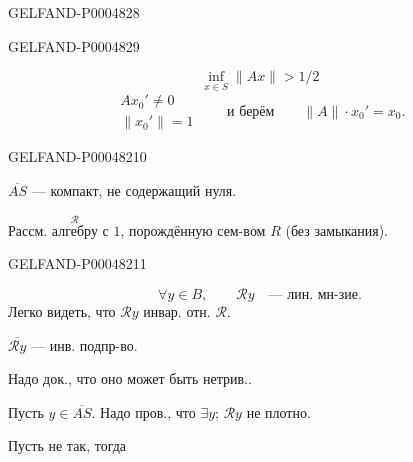 \begin{GelfandAdjacentEvidence}{GELFAND-P000482}{8}

\end{GelfandAdjacentEvidence}
\begin{GelfandAdjacentEvidence}{GELFAND-P000482}{9}

\[
\inf_{x\in S}\lVert Ax\rVert>1/2
\]
\[
\begin{gathered}
Ax_0'\ne0\\
\lVert x_0'\rVert=1
\end{gathered}
\qquad\text{и берём}\qquad
\lVert A\rVert\cdot x_0'=x_0.
\]
\end{GelfandAdjacentEvidence}
\begin{GelfandAdjacentEvidence}{GELFAND-P000482}{10}


$\overline{AS}$ — компакт, не содержащий нуля.

Рассм. $\overset{\mathcal R}{\text{алгебру}}$ с $1$,
порождённую сем-вом $R$ (без замыкания).
\end{GelfandAdjacentEvidence}
\begin{GelfandAdjacentEvidence}{GELFAND-P000482}{11}

\[
\forall y\in B,\qquad \mathcal R y\quad\text{— лин. мн-зие}.
\]
Легко видеть, что $\mathcal R y$ инвар. отн. $\mathcal R$.

$\overline{\mathcal R y}$ — инв. подпр-во.

Надо док., что оно может быть нетрив..

Пусть $y\in\overline{AS}$. Надо пров., что $\exists y$;
$\mathcal R y$ не плотно.

Пусть не так, тогда
\end{GelfandAdjacentEvidence}
